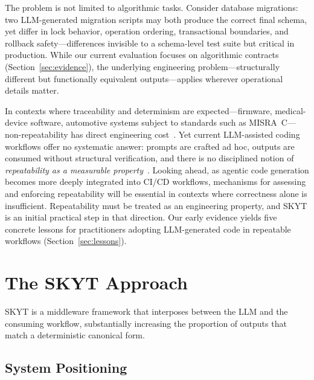\documentclass[sigconf]{acmart}
\begin{document}
The problem is not limited to algorithmic tasks.  Consider database migrations: two LLM-generated migration scripts may both produce the correct final schema, yet differ in lock behavior, operation ordering, transactional boundaries, and rollback safety---differences invisible to a schema-level test suite but critical in production.  While our current evaluation focuses on algorithmic contracts (Section~\ref{sec:evidence}), the underlying engineering problem---structurally different but functionally equivalent outputs---applies wherever operational details matter.

In contexts where traceability and determinism are expected---firmware, medical-device software, automotive systems subject to standards such as MISRA~C---non-repeatability has direct engineering cost~\cite{zhu2024hot}. Yet current LLM-assisted coding workflows offer no systematic answer: prompts are crafted ad hoc, outputs are consumed without structural verification, and there is no disciplined notion of \emph{repeatability as a measurable property}~\cite{vaithilingam2022expectation, barke2023grounded}. Looking ahead, as agentic code generation becomes more deeply integrated into CI/CD workflows, mechanisms for assessing and enforcing repeatability will be essential in contexts where correctness alone is insufficient. Repeatability must be treated as an engineering property, and SKYT is an initial practical step in that direction. Our early evidence yields five concrete lessons for practitioners adopting LLM-generated code in repeatable workflows (Section~\ref{sec:lessons}).

\section{The SKYT Approach}
\label{sec:approach}

SKYT is a middleware framework that interposes between the LLM and the consuming workflow, substantially increasing the proportion of outputs that match a deterministic canonical form.

\subsection{System Positioning}
\label{sec:positioning}
\end{document}
